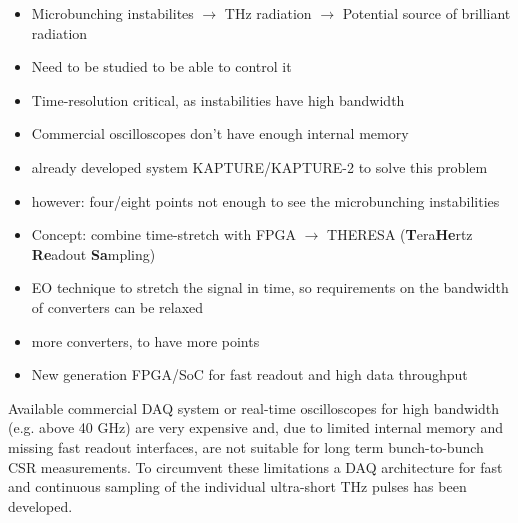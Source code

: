 \begin{itemize}
	\item Microbunching instabilites $\rightarrow$ THz radiation $\rightarrow$ Potential source of brilliant radiation
	\item Need to be studied to be able to control it
	\item Time-resolution critical, as instabilities have high bandwidth
	\item Commercial oscilloscopes don't have enough internal memory
	\item already developed system KAPTURE/KAPTURE-2 to solve this problem
	\item however: four/eight points not enough to see the microbunching instabilities
	\item Concept: combine time-stretch with FPGA $\rightarrow$ THERESA (\textbf{T}era\textbf{He}rtz \textbf{Re}adout \textbf{Sa}mpling)
	\item EO technique to stretch the signal in time, so requirements on the bandwidth of converters can be relaxed
	\item more converters, to have more points
	\item New generation FPGA/SoC for fast readout and high data throughput
\end{itemize}

Available commercial DAQ system or real-time oscilloscopes for high bandwidth (e.g. above
40 GHz) are very expensive and, due to limited internal memory and missing fast readout interfaces, are not suitable for long term bunch-to-bunch CSR measurements. To circumvent these limitations a DAQ architecture for fast and continuous sampling of the individual ultra-short THz pulses has been developed.


